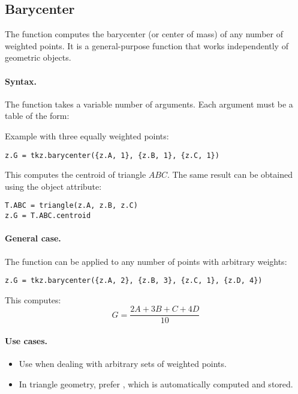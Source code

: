\subsection{Barycenter}
\label{sub:misc_barycenter}

The function  computes the barycenter (or center of mass) of any number of weighted points. It is a general-purpose function that works independently of geometric objects.

\paragraph{Syntax.}
The function takes a variable number of arguments. Each argument must be a table of the form:

\begin{center}
\end{center}

\noindent
Example with three equally weighted points:
\begin{mybox}
\begin{verbatim}
z.G = tkz.barycenter({z.A, 1}, {z.B, 1}, {z.C, 1})
\end{verbatim}
\end{mybox}

This computes the centroid of triangle $ABC$. The same result can be obtained using the object attribute:

\begin{mybox}
\begin{verbatim}
T.ABC = triangle(z.A, z.B, z.C)
z.G = T.ABC.centroid
\end{verbatim}
\end{mybox}

\paragraph{General case.}
The function can be applied to any number of points with arbitrary weights:

\begin{mybox}
\begin{verbatim}
z.G = tkz.barycenter({z.A, 2}, {z.B, 3}, {z.C, 1}, {z.D, 4})
\end{verbatim}
\end{mybox}

This computes:
\[
G = \frac{2A + 3B + C + 4D}{10}
\]

\paragraph{Use cases.}
\begin{itemize}
  \item Use  when dealing with arbitrary sets of weighted points.
  \item In triangle geometry, prefer , which is automatically computed and stored.
\end{itemize}

